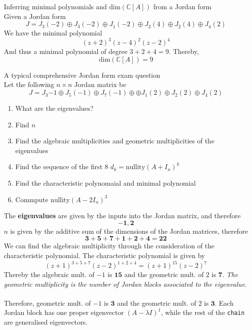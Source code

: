 \documentclass[journal, letterpaper]{IEEEtran}
\begin{document}
    \begin{myboxg}{Inferring minimal polynomials and $\text{dim}(\mathbb{C}[A])$ from a Jordan form} \\ 
        Given a Jordan form 
        $$ J = J_3(-2) \oplus J_3(-2) \oplus J_1(-2) \oplus J_2(4) \oplus J_2(4) \oplus J_4(2)$$
        We have the minimal polynomial
        $$ (z + 2)^3(z-4)^2(z - 2)^4$$
        And thus a minimal polynomial of degree $3 + 2 + 4 = 9$. Thereby,
        $$ \text{dim}(\mathbb{C}[A]) = 9$$
    \end{myboxg}
    \begin{myboxg}{A typical comprehensive Jordan form exam question} \\ 
        Let the following $n\times n$ Jordan matrix be
        $$ J = J_3{-1} \oplus J_5(-1) \oplus J_7(-1) \oplus \oplus J_1(2) \oplus J_2(2) \oplus J_4(2)$$
        \begin{enumerate}
            \item What are the eigenvalues?
            \item Find $n$
            \item Find the algebraic multiplicities and geometric multiplicities of the eigenvalues
            \item Find the sequence of the first 8 $d_k = \text{nullity}(A + I_n)^k$
            \item Find the characteristic polynomaial and minimal polynomial
            \item Commpute $\text{nullity}(A - 2I_n)^3$
        \end{enumerate}
        The \textbf{eigenvalues} are given by the inputs into the Jordan matrix, and therefore
        $$ \mathbf{-1, 2}$$
        $n$ is given by the additive sum of the dimensions of the Jordan matrices, therefore
        $$ \mathbf{3 + 5 + 7 + 1 + 2 + 4 = 22}$$
        We can find the algebraic multiplicity through the consideration of the characteristic polynomial. The characteristic 
        polynomial is given by
        $$ (z + 1)^{3 + 5 + 7}(z - 2)^{1 + 2 + 4} = (z + 1)^{15}(z - 2)^7$$
        Thereby the algebraic mult. of $-1$ is $\mathbf{15}$ and the geometric mult. of $2$ is $\mathbf{7}$. \textit{The geometric multiplicity is the number of Jordan blocks associated to the eigenvalue}. \\ \\ 
        Therefore, geometric mult. of $-1$ is $\mathbf{3}$ and the geometric mult. of $2$ is $\mathbf{3}$. Each Jordan block has one 
        proper eigenvector $(A - \lambda I)^{1}$, while the rest of the \verb|chain| are generalised eigenvectors.

\end{myboxg}
\end{document}
